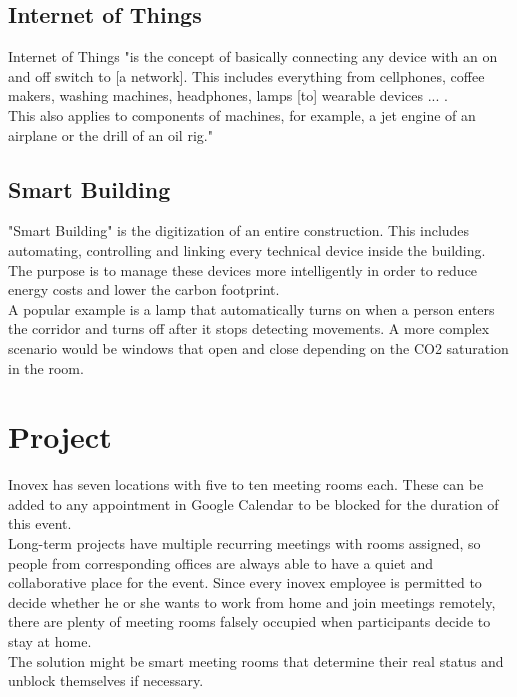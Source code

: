 \subsection{Internet of Things}
Internet of Things "is the concept of basically connecting any device with an on and off switch to [a network]. This includes everything from cellphones, coffee makers, washing machines, headphones, lamps [to] wearable devices ... .\\
This also applies to components of machines, for example, a jet engine of an airplane or the drill of an oil rig."\cite{forbes-iot}

\subsection{Smart Building}
"Smart Building" is the digitization of an entire construction. This includes automating, controlling and linking every technical device inside the building. The purpose is to manage these devices more intelligently in order to reduce energy costs and lower the carbon footprint.\cite{kiwi-sb}\\
A popular example is a lamp that automatically turns on when a person enters the corridor and turns off after it stops detecting movements. A more complex scenario would be windows that open and close depending on the CO2 saturation in the room.
\newpage

\section{Project}
Inovex has seven locations with five to ten meeting rooms each. These can be added to any appointment in Google Calendar to be blocked for the duration of this event.\\
Long-term projects have multiple recurring meetings with rooms assigned, so people from corresponding offices are always able to have a quiet and collaborative place for the event. Since every inovex employee is permitted to decide whether he or she wants to work from home and join meetings remotely, there are plenty of meeting rooms falsely occupied when participants decide to stay at home.\\
The solution might be smart meeting rooms that determine their real status and unblock themselves if necessary.

